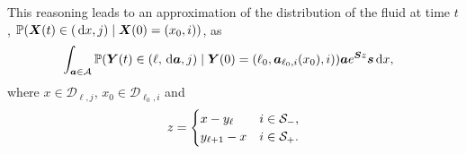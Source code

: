 This reasoning leads to an approximation of the distribution of the fluid at time \(t\), \(\mathbb P(\boldsymbol X(t)\in (\, \mathrm{d} x,j) \mid \boldsymbol X(0)=(x_0,i)) \), as
\begin{align}
		&\int_{\boldsymbol a \in\mathcal A}\mathbb P(\boldsymbol Y(t) \in (\ell, \, \mathrm{d} \boldsymbol a, j)\mid \boldsymbol Y(0)=(\ell_0, \boldsymbol a_{\ell_0,i}(x_0), i) )
		\boldsymbol a e^{\boldsymbol{S}z} \boldsymbol s \, \mathrm{d} x,
		\label{eqn: density approx aug}
\end{align}
where \(x\in\mathcal D_{\ell,j}\), \(x_0\in\mathcal D_{\ell_0,i}\) and 
\[
	z = \begin{cases} 
		x - y_\ell & i\in\mathcal{S}_-, \\
		y_{\ell+1} - x & i\in\mathcal{S}_+.
	\end{cases}
\]

